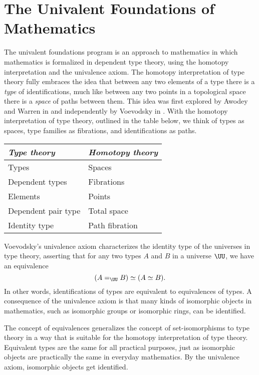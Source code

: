 \chapter{The Univalent Foundations of Mathematics}\label{chap:uf}

The univalent foundations program is an approach to mathematics in which mathematics is formalized in dependent type theory, using the homotopy interpretation and the univalence axiom. The homotopy interpretation of type theory fully embraces the idea that between any two elements of a type there is a \emph{type} of identifications, much like between any two points in a topological space there is a \emph{space} of paths between them. This idea was first explored by Awodey and Warren in \cite{AwodeyWarren} and independently by Voevodsky in \cite{Voevodsky06}. With the homotopy interpretation of type theory, outlined in the table below, we think of types as spaces, type families as fibrations, and identifications as paths.
\begin{table}
\begin{tabular}{ll}
\toprule
\emph{Type theory} &  \emph{Homotopy theory} \\
\midrule
Types  & Spaces \\
Dependent types & Fibrations \\
Elements & Points \\
Dependent pair type & Total space \\
Identity type & Path fibration\\
\bottomrule
\end{tabular}
\end{table}

Voevodsky's univalence axiom characterizes the identity type of the universes in type theory, asserting that for any two types $A$ and $B$ in a universe $\UU$, we have an equivalence
\begin{equation*}
  (A=_{\UU}B)\simeq (A\simeq B).
\end{equation*}
In other words, identifications of types are equivalent to equivalences of types. A consequence of the univalence axiom is that many kinds of isomorphic objects in mathematics, such as isomorphic groups or isomorphic rings, can be identified.

The concept of equivalences generalizes the concept of set-isomorphisms to type theory in a way that is suitable for the homotopy interpretation of type theory. Equivalent types are the same for all practical purposes, just as isomorphic objects are practically the same in everyday mathematics. By the univalence axiom, isomorphic objects get identified.

